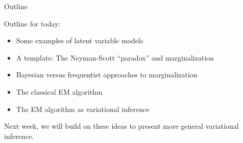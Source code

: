 
\begin{frame}{Outline}

Outline for today:

\begin{itemize}
    \item Some examples of latent variable models
    \item A template: The Neyman-Scott ``paradox'' and marginalization
    \item Bayesian versus frequentist approaches to marginalization
    \item The classical EM algorithm
    \item The EM algorithm as variational inference
\end{itemize}

Next week, we will build on these ideas to present more general variational
inference.

\end{frame}



